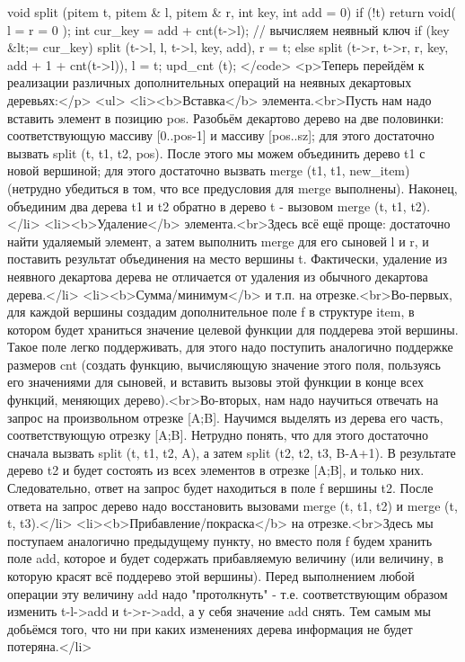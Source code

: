 void split (pitem t, pitem & l, pitem & r, int key, int add = 0) {
	if (!t)
		return void( l = r = 0 );
	int cur_key = add + cnt(t->l); // вычисляем неявный ключ
	if (key &lt;= cur_key)
		split (t->l, l, t->l, key, add),  r = t;
	else
		split (t->r, t->r, r, key, add + 1 + cnt(t->l)),  l = t;
	upd_cnt (t);
}</code>
<p>Теперь перейдём к реализации различных дополнительных операций на неявных декартовых деревьях:</p>
<ul>
<li><b>Вставка</b> элемента.<br>Пусть нам надо вставить элемент в позицию pos. Разобьём декартово дерево на две половинки: соответствующую массиву [0..pos-1] и массиву [pos..sz]; для этого достаточно вызвать split (t, t1, t2, pos). После этого мы можем объединить дерево t1 с новой вершиной; для этого достаточно вызвать merge (t1, t1, new_item) (нетрудно убедиться в том, что все предусловия для merge выполнены). Наконец, объединим два дерева t1 и t2 обратно в дерево t - вызовом merge (t, t1, t2).</li>
<li><b>Удаление</b> элемента.<br>Здесь всё ещё проще: достаточно найти удаляемый элемент, а затем выполнить merge для его сыновей l и r, и поставить результат объединения на место вершины t. Фактически, удаление из неявного декартова дерева не отличается от удаления из обычного декартова дерева.</li>
<li><b>Сумма/минимум</b> и т.п. на отрезке.<br>Во-первых, для каждой вершины создадим дополнительное поле f в структуре item, в котором будет храниться значение целевой функции для поддерева этой вершины. Такое поле легко поддерживать, для этого надо поступить аналогично поддержке размеров cnt (создать функцию, вычисляющую значение этого поля, пользуясь его значениями для сыновей, и вставить вызовы этой функции в конце всех функций, меняющих дерево).<br>Во-вторых, нам надо научиться отвечать на запрос на произвольном отрезке [A;B]. Научимся выделять из дерева его часть, соответствующую отрезку [A;B]. Нетрудно понять, что для этого достаточно сначала вызвать split (t, t1, t2, A), а затем split (t2, t2, t3, B-A+1). В результате дерево t2 и будет состоять из всех элементов в отрезке [A;B], и только них. Следовательно, ответ на запрос будет находиться в поле f вершины t2. После ответа на запрос дерево надо восстановить вызовами merge (t, t1, t2) и merge (t, t, t3).</li>
<li><b>Прибавление/покраска</b> на отрезке.<br>Здесь мы поступаем аналогично предыдущему пункту, но вместо поля f будем хранить поле add, которое и будет содержать прибавляемую величину (или величину, в которую красят всё поддерево этой вершины). Перед выполнением любой операции эту величину add надо "протолкнуть" - т.е. соответствующим образом изменить t-l->add и t->r->add, а у себя значение add снять. Тем самым мы добьёмся того, что ни при каких изменениях дерева информация не будет потеряна.</li>
